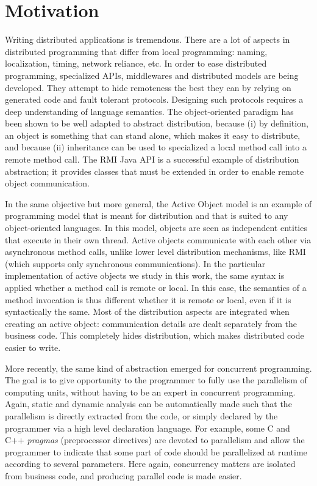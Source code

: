 \documentclass[11pt]{report}
\begin{document}
\section{Motivation}
Writing distributed applications is tremendous. There are a lot of aspects in distributed programming that differ from local programming: naming, localization, timing, network reliance, etc. In order to ease distributed programming, specialized APIs, middlewares and distributed models are being developed. They attempt to hide remoteness the best they can by relying on generated code and fault tolerant protocols. Designing such protocols requires a deep understanding of language semantics. The object-oriented paradigm has been shown to be well adapted to abstract distribution, because (i) by definition, an object is something that can stand alone, which makes it easy to distribute, and because (ii) inheritance can be used to specialized a local method call into a remote method call. The RMI Java API \cite{ref:rmi} is a successful example of distribution abstraction; it provides classes that must be extended in order to enable remote object communication. 

In the same objective but more general, the Active Object model \cite{ref:Lavender95activeobject} is an example of programming model that is meant for distribution and that is suited to any object-oriented languages. In this model, objects are seen as independent entities that execute in their own thread. Active objects communicate with each other via asynchronous method calls, unlike lower level distribution mechanisms, like RMI (which supports only synchronous communications).
In the particular implementation of active objects we study in this work, the same syntax is applied whether a method call is remote or local. In this case, the semantics of a method invocation is thus different whether it is remote or local, even if it is syntactically the same. Most of the distribution aspects are integrated when creating an active object: communication details are dealt separately from the business code. This completely hides distribution, which makes distributed code easier to write. 

More recently, the same kind of abstraction emerged for concurrent programming. The goal is to give opportunity to the programmer to fully use the parallelism of computing units, without having to be an expert in concurrent programming. Again, static and dynamic analysis can be automatically made such that the parallelism is directly extracted from the code, or simply declared by the programmer via a high level declaration language. For example, some C and C++ \emph{pragmas} (preprocessor directives) \cite{ref:openmp} are devoted to parallelism and allow the programmer to indicate that some part of code should be parallelized at runtime according to several parameters. Here again, concurrency matters are isolated from business code, and producing parallel code is made easier.
\end{document}
